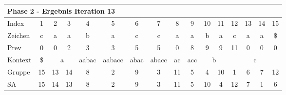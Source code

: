 \begin{table}[H]
\centering
\begin{adjustbox}{max width=\textwidth}
\centering
\begin{tabular}{lccccccccccccccc}
\multicolumn{16}{l}{Phase 2 - Ergebnis Iteration 13}                                                                                                                                                                                                                                                                                                            \\ \hline
\multicolumn{1}{l|}{Index}   & 1                       & 2  & 3                       & 4                          & 5                           & 6                         & 7                          & 8                       & 9                        & 10 & 11                      & 12 & 13                        & 14 & 15                        \\
\multicolumn{1}{l|}{Zeichen} & c                       & a  & a                       & b                          & a                           & c                         & c                          & a                       & a                        & b  & a                       & c  & a                         & a  & \$                        \\
\multicolumn{1}{l|}{Prev}    & 0                       & 0  & 2                       & 3                          & 3                           & 5                         & 5                          & 0                       & 8                        & 9  & 9                       & 11 & 0                         & 0  & 0                         \\ \hline
\multicolumn{1}{l|}{Kontext} & \multicolumn{1}{c|}{\$} & \multicolumn{2}{c|}{a}       & \multicolumn{1}{c|}{aabac} & \multicolumn{1}{c|}{aabacc} & \multicolumn{1}{c|}{abac} & \multicolumn{1}{c|}{abacc} & \multicolumn{1}{c|}{ac} & \multicolumn{1}{c|}{acc} & \multicolumn{2}{c|}{b}       & \multicolumn{4}{c}{c}                                           \\
\multicolumn{1}{l|}{Gruppe}  & \multicolumn{1}{c|}{15} & 13 & \multicolumn{1}{c|}{14} & \multicolumn{1}{c|}{8}     & \multicolumn{1}{c|}{2}      & \multicolumn{1}{c|}{9}    & \multicolumn{1}{c|}{3}     & \multicolumn{1}{c|}{11} & \multicolumn{1}{c|}{5}   & 4  & \multicolumn{1}{c|}{10} & 1  & 6                         & 7  & 12                        \\
\multicolumn{1}{l|}{SA}      & \multicolumn{1}{c|}{15} & 14 & \multicolumn{1}{c|}{13} & \multicolumn{1}{c|}{8}     & \multicolumn{1}{c|}{2}      & \multicolumn{1}{c|}{9}    & \multicolumn{1}{c|}{3}     & \multicolumn{1}{c|}{11} & \multicolumn{1}{c|}{5}   & 10 & \multicolumn{1}{c|}{4}  & 12 & \cellcolor[HTML]{\green}7 & 1  & \cellcolor[HTML]{\red}6
\end{tabular}
\end{adjustbox}


\end{table}
